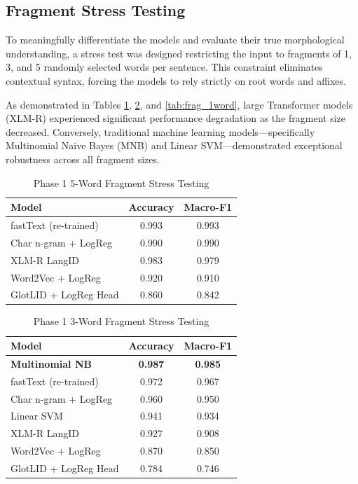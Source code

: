 \documentclass[conference]{IEEEtran}
\begin{document}
\subsection{Fragment Stress Testing}
To meaningfully differentiate the models and evaluate their true morphological understanding, a stress test was designed restricting the input to fragments of 1, 3, and 5 randomly selected words per sentence. This constraint eliminates contextual syntax, forcing the models to rely strictly on root words and affixes.

As demonstrated in Tables \ref{tab:frag_5word}, \ref{tab:frag_3word}, and \ref{tab:frag_1word}, large Transformer models (XLM-R) experienced significant performance degradation as the fragment size decreased. Conversely, traditional machine learning models—specifically Multinomial Naive Bayes (MNB) and Linear SVM—demonstrated exceptional robustness across all fragment sizes.

\begin{table}[htbp]
\caption{Phase 1 5-Word Fragment Stress Testing}
\begin{center}
\begin{tabular}{lcc}
\toprule
\textbf{Model} & \textbf{Accuracy} & \textbf{Macro-F1} \\
\midrule
fastText (re-trained) & 0.993 & 0.993 \\
Char n-gram + LogReg & 0.990 & 0.990 \\
XLM-R LangID & 0.983 & 0.979 \\
Word2Vec + LogReg & 0.920 & 0.910 \\
GlotLID + LogReg Head & 0.860 & 0.842 \\
\bottomrule
\end{tabular}
\label{tab:frag_5word}
\end{center}
\end{table}

\begin{table}[htbp]
\caption{Phase 1 3-Word Fragment Stress Testing}
\begin{center}
\begin{tabular}{lcc}
\toprule
\textbf{Model} & \textbf{Accuracy} & \textbf{Macro-F1} \\
\midrule
\textbf{Multinomial NB} & \textbf{0.987} & \textbf{0.985} \\
fastText (re-trained) & 0.972 & 0.967 \\
Char n-gram + LogReg & 0.960 & 0.950 \\
Linear SVM & 0.941 & 0.934 \\
XLM-R LangID & 0.927 & 0.908 \\
Word2Vec + LogReg & 0.870 & 0.850 \\
GlotLID + LogReg Head & 0.784 & 0.746 \\
\bottomrule
\end{tabular}
\label{tab:frag_3word}
\end{center}
\end{table}
\end{document}
